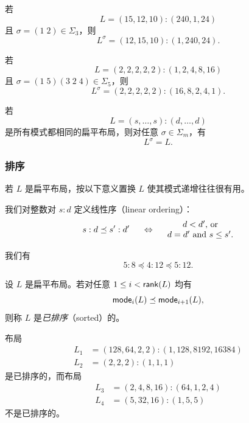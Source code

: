 \begin{example}
    若
    \[L = (15,12,10):(240,1,24)\]
    且 $\sigma = (1 \; 2 ) \in \Sigma_3$，则
    \[
    L^\sigma = (12,15,10):(1,240,24).
    \]
\end{example}

\begin{example}
    若
    \[L = (2,2,2,2,2):(1,2,4,8,16)\]
    且 $\sigma = (1 \; 5)(3 \; 2 \; 4) \in \Sigma_5$，则
    \[
    L^\sigma = (2,2,2,2,2):(16,8,2,4,1).
    \]
\end{example}

\begin{example}
    若
    \[
    L = (s,\dots,s):(d,\dots,d)
    \]
    是所有模式都相同的扁平布局，则对任意 $\sigma \in \Sigma_m$，有
    \[
    L^\sigma = L.
    \]
\end{example}

\subsubsection{排序}

若 $L$ 是扁平布局，按以下意义置换 $L$ 使其模式递增往往很有用。

\begin{definition}
我们对整数对 $s:d$ 定义线性序（linear ordering）：
\[
s:d \preceq s':d' \hspace{0.2in} \Leftrightarrow \hspace{0.2in} \begin{matrix} d < d' \text{, or}\\
d = d'\text{ and }s \leq s'.
\end{matrix}
\]

\end{definition}

\begin{example}
    我们有
    \[
    5:8 \preceq 4:12 \preceq 5:12.
    \]
\end{example}

\begin{definition}\label{definitionofsorted}
    设 $L$ 是扁平布局。若对任意 $1 \leq i < \mathsf{rank}(L)$ 均有
    \[
    \mathsf{mode}_i(L) \preceq \mathsf{mode}_{i+1}(L),
    \]
    则称 $L$ 是{\it 已排序}（sorted）的。
\end{definition}

\begin{example}\label{sortedlayoutexample}
布局
\begin{align*}
L_1 & = (128,64,2,2):(1,128,8192,16384)\\
L_2 & = (2,2,2):(1,1,1)
\end{align*}
是已排序的，而布局
\begin{align*}
L_3 & = (2,4,8,16):(64,1,2,4)\\
L_4 & = (5,32,16):(1,5,5)
\end{align*}
不是已排序的。
\end{example}

